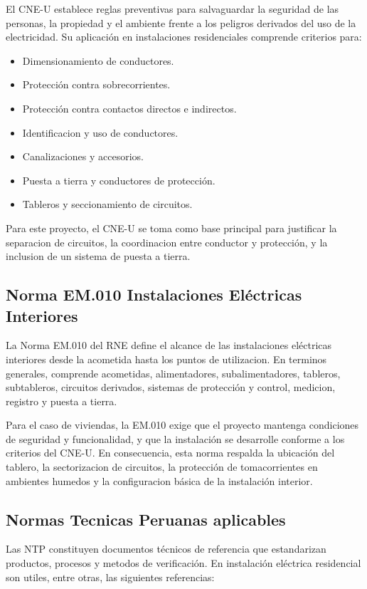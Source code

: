 El CNE-U establece reglas preventivas para salvaguardar la seguridad de las personas, la propiedad y el ambiente frente a los peligros derivados del uso de la electricidad. Su aplicación en instalaciones residenciales comprende criterios para:

\begin{itemize}
  \item Dimensionamiento de conductores.
  \item Protección contra sobrecorrientes.
  \item Protección contra contactos directos e indirectos.
  \item Identificacion y uso de conductores.
  \item Canalizaciones y accesorios.
  \item Puesta a tierra y conductores de protección.
  \item Tableros y seccionamiento de circuitos.
\end{itemize}

Para este proyecto, el CNE-U se toma como base principal para justificar la separacion de circuitos, la coordinacion entre conductor y protección, y la inclusion de un sistema de puesta a tierra.

\subsection{Norma EM.010 Instalaciones Eléctricas Interiores}

La Norma EM.010 del RNE define el alcance de las instalaciones eléctricas interiores desde la acometida hasta los puntos de utilizacion. En terminos generales, comprende acometidas, alimentadores, subalimentadores, tableros, subtableros, circuitos derivados, sistemas de protección y control, medicion, registro y puesta a tierra.

Para el caso de viviendas, la EM.010 exige que el proyecto mantenga condiciones de seguridad y funcionalidad, y que la instalación se desarrolle conforme a los criterios del CNE-U. En consecuencia, esta norma respalda la ubicación del tablero, la sectorizacion de circuitos, la protección de tomacorrientes en ambientes humedos y la configuracion básica de la instalación interior.

\subsection{Normas Tecnicas Peruanas aplicables}

Las NTP constituyen documentos técnicos de referencia que estandarizan productos, procesos y metodos de verificación. En instalación eléctrica residencial son utiles, entre otras, las siguientes referencias:

